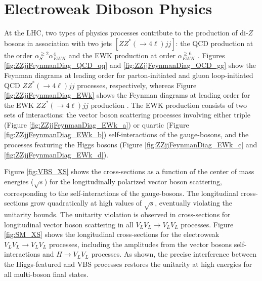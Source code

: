 \section{Electroweak Diboson Physics } 
\label{sec:EWKPheno}

At the LHC, two types of physics processes contribute to the production of di-$Z$ bosons in association with two jets $[ ZZ^*( \rightarrow 4\ell) jj ]$: the QCD production at the order $\alpha_{S}^{\geq 2} \alpha_{EWK}^{4}$ and the EWK production at order $\alpha_{EWK}^{\geq6}$ \cite{CMSRun2ZZjj}. Figures \ref{fig:ZZjjFeynmanDiag_QCD_qq} and \ref{fig:ZZjjFeynmanDiag_QCD_gg} show the Feynman diagrams at leading order for parton-initiated and gluon loop-initiated QCD $ZZ^*(\rightarrow 4\ell) jj$ processes, respectively, whereas Figure \ref{fig:ZZjjFeynmanDiag_EWk} shows the Feynman diagrams at leading order for the EWK $ZZ^*(\rightarrow 4\ell) jj$ production \cite{PowhegV2ZZjj}. The EWK production consists of two sets of interactions: the vector boson scattering processes involving either triple (Figure \ref{fig:ZZjjFeynmanDiag_EWk_a}) or quartic (Figure \ref{fig:ZZjjFeynmanDiag_EWk_b}) self-interactions of the gauge-bosons, and the processes featuring the Higgs bosons (Figure \ref{fig:ZZjjFeynmanDiag_EWk_c} and \ref{fig:ZZjjFeynmanDiag_EWk_d}). 

Figure \ref{fig:VBS_XS} shows the cross-sections as a function of the center of mass energies ($\sqrt{s}$) for the longitudinally polarized vector boson scattering, corresponding to the self-interactions of the gauge-bosons. The longitudinal cross-sections grow quadratically at high values of $\sqrt{s}$, eventually violating the unitarity bounds. The unitarity violation is observed in cross-sections for longitudinal vector boson scattering in all $V_L V_L \rightarrow V_L V_L$ processes. Figure \ref{fig:SM_XS} shows the longitudinal cross-sections for the electroweak $V_L V_L \rightarrow V_L V_L$ processes, including the amplitudes from the vector bosons self-interactions and $H\rightarrow V_L V_L$ processes. As shown, the precise interference between the Higgs-featured and VBS processes restores the unitarity at high energies for all multi-boson final states\cite {VBSWWWW}.

